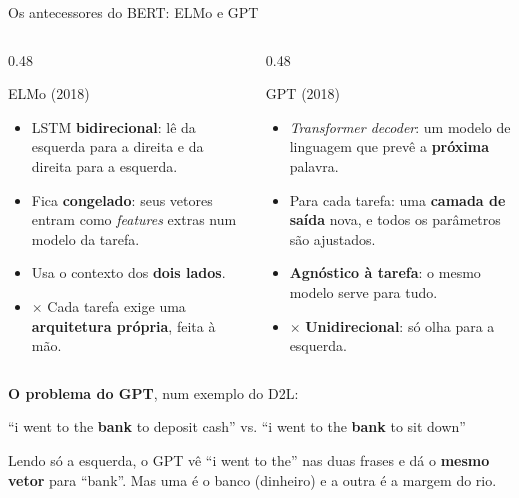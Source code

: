 \begin{frame}{Os antecessores do BERT: ELMo e GPT}
    \begin{columns}[t]
        \begin{column}{0.48\textwidth}
            \begin{block}{ELMo (2018)}
                \footnotesize
                \begin{itemize}
                    \item LSTM \textbf{bidirecional}: lê da esquerda para a direita e da direita para a esquerda.
                    \item Fica \textbf{congelado}: seus vetores entram como \textit{features} extras num modelo da tarefa.
                    \item {\color{dexpiGreenDark}\checkmark} Usa o contexto dos \textbf{dois lados}.
                    \item {\color{dexpiRedDark}$\times$} Cada tarefa exige uma \textbf{arquitetura própria}, feita à mão.
                \end{itemize}
            \end{block}
        \end{column}
        \begin{column}{0.48\textwidth}
            \begin{block}{GPT (2018)}
                \footnotesize
                \begin{itemize}
                    \item \textit{Transformer decoder}: um modelo de linguagem que prevê a \textbf{próxima} palavra.
                    \item Para cada tarefa: uma \textbf{camada de saída} nova, e todos os parâmetros são ajustados.
                    \item {\color{dexpiGreenDark}\checkmark} \textbf{Agnóstico à tarefa}: o mesmo modelo serve para tudo.
                    \item {\color{dexpiRedDark}$\times$} \textbf{Unidirecional}: só olha para a esquerda.
                \end{itemize}
            \end{block}
        \end{column}
    \end{columns}
    \vspace{0.2cm}
    \footnotesize
    \textbf{O problema do GPT}, num exemplo do D2L:
    \begin{center}
        ``i went to the \textbf{bank} to deposit cash'' \qquad vs. \qquad ``i went to the \textbf{bank} to sit down''
    \end{center}
    \vspace{-0.1cm}
    Lendo só a esquerda, o GPT vê ``i went to the'' nas duas frases e dá o \textbf{mesmo vetor} para ``bank''. Mas uma é o banco (dinheiro) e a outra é a margem do rio.


\end{frame}
